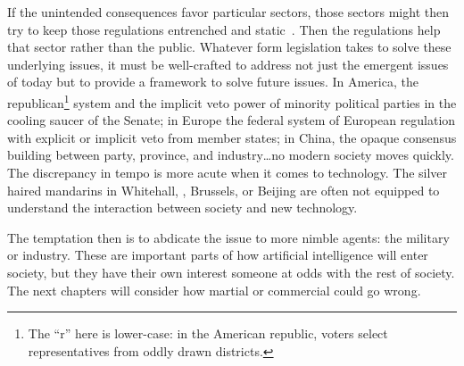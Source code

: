 If the unintended consequences favor particular sectors, those sectors
might then try to keep those regulations entrenched and static~\citep{croley-08}.  Then
the regulations help that sector rather than the public.
%
Whatever form legislation takes to solve these underlying issues, it
must be well-crafted to address not just the emergent issues of today
but to provide a framework to solve future issues.
%
In America, the republican\footnote{The ``r'' here is lower-case: in the
  American republic, voters select representatives from oddly drawn
  districts.} system and the implicit veto power of minority political parties in the
cooling saucer of the Senate; in Europe the federal system of European
regulation with explicit or implicit veto from member states; in
China, the opaque consensus building between party, province, and
industry\dots no modern society moves quickly.
%
The discrepancy in tempo is more acute when it comes to technology.
%
The silver haired mandarins in Whitehall, , Brussels, or Beijing
are often not equipped to understand the interaction between society
and new technology.


The temptation then is to abdicate the issue to more nimble agents:
the military or industry.
%
These are important parts of how artificial intelligence will enter
society, but they have their own interest someone at odds with the
rest of society.
%
The next chapters will consider how martial or commercial 
could go wrong.


